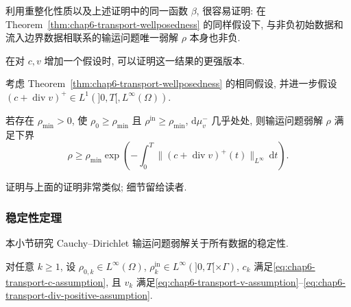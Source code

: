\begin{sloppypar}
利用重整化性质以及上述证明中的同一函数 $\beta$, 很容易证明: 在 Theorem~\ref{thm:chap6-transport-wellposedness} 的同样假设下, 与非负初始数据和流入边界数据相联系的输运问题唯一弱解 $\rho$ 本身也非负.

在对 $c,v$ 增加一个假设时, 可以证明这一结果的更强版本.

\begin{Proposition}
\label{prop:chap6-positive-lower-bound}
考虑 Theorem~\ref{thm:chap6-transport-wellposedness} 的相同假设, 并进一步假设
$(c+\operatorname{div}v)^+\in L^1(]0,T[,L^\infty(\Omega))$.

若存在 $\rho_{\min}>0$, 使 $\rho_0\geq\rho_{\min}$ 且
$\rho^{\mathrm{in}}\geq\rho_{\min}$, $\mathrm d\mu_v^-$ 几乎处处, 则输运问题弱解 $\rho$ 满足下界
\[
 \rho\geq\rho_{\min}
 \exp\left(-\int_0^T\|(c+\operatorname{div}v)^+(t)\|_{L^\infty}\,\mathrm dt\right).
\]
\end{Proposition}

证明与上面的证明非常类似; 细节留给读者.

\subsubsection{稳定性定理}
\label{subsec:chap6-transport-stability}

本小节研究 Cauchy--Dirichlet 输运问题弱解关于所有数据的稳定性.

\begin{Theorem}
\label{thm:chap6-transport-stability}
对任意 $k\geq1$, 设 $\rho_{0,k}\in L^\infty(\Omega)$,
$\rho_k^{\mathrm{in}}\in L^\infty(]0,T[\times\Gamma)$, $c_k$ 满足\eqref{eq:chap6-transport-c-assumption}, 且 $v_k$ 满足\eqref{eq:chap6-transport-v-assumption}--\eqref{eq:chap6-transport-div-positive-assumption}.


\end{Theorem}
\end{sloppypar}
